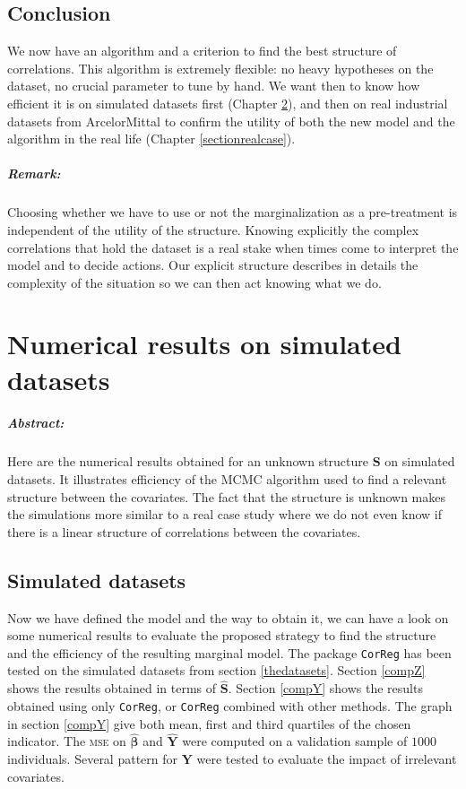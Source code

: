 \documentclass[12pt,a4paper]{report}
\begin{document}
\section{Conclusion}	We now have an algorithm and a criterion to find the best structure of correlations. This algorithm is extremely flexible: no heavy hypotheses on the dataset, no crucial parameter to tune by hand. We want then to know how efficient it is on simulated datasets first (Chapter \ref{sectionsimul}), and then on real industrial datasets from ArcelorMittal to confirm the utility of both the new model and the algorithm in the real life (Chapter \ref{sectionrealcase}).	
		\paragraph{Remark:} Choosing whether we have to use or not the marginalization as a pre-treatment is independent of the utility of the structure. Knowing explicitly the complex correlations that hold the dataset is a real stake when times come to interpret the model and to  decide actions. Our explicit structure describes in details the complexity of the situation so we can then act knowing what we do. 		
	\chapter{Numerical results on simulated datasets} \label{sectionsimul}
\paragraph{Abstract:} Here are the numerical results obtained for an unknown structure $\boldsymbol{S}$ on simulated datasets. It illustrates efficiency of the MCMC algorithm used to find a relevant structure between the covariates. The fact that the structure is unknown makes the simulations more similar to a real case study where we do not even know if there is a linear structure of correlations between the covariates.
		 

	\section{Simulated datasets}	
	Now we have defined the model and the way to obtain it, we can have a look on some numerical results to evaluate the proposed strategy to find the structure and the efficiency of the resulting marginal model.	The package {\tt CorReg} has been tested on the simulated datasets from section \ref{thedatasets}.
Section \ref{compZ} shows the results obtained in terms of $\hat{\boldsymbol{S}}$. Section \ref{compY} shows the results obtained using only {\tt CorReg}, or {\tt CorReg} combined with other methods. The graph in section \ref{compY} give both mean, first and third quartiles of the chosen indicator. The \textsc{mse} on $\hat{\boldsymbol{\beta}}$ and $\hat{\boldsymbol{Y}}$ were computed on a validation sample of $1 000$ individuals. Several pattern for $\boldsymbol{Y}$ were tested to evaluate the impact of irrelevant covariates.\\
\end{document}
